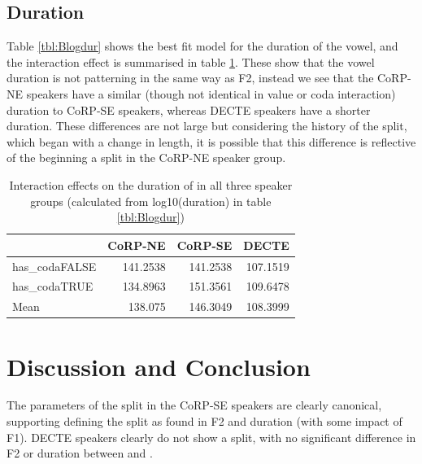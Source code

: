 \documentclass[../../00.FullDoc/tex/Thesis]{subfiles}
\begin{document}
\subsection{Duration}
Table \ref{tbl:Blogdur} shows the best fit model for the duration of the \bath{} vowel, and the interaction effect is summarised in table \ref{tbl:Blogdur-inter}. These show that the \bath{} vowel duration is not patterning in the same way as F2, instead we see that the CoRP-NE speakers have a similar (though not identical in value or coda interaction) duration to CoRP-SE speakers, whereas DECTE speakers have a shorter duration. These differences are not large but considering the history of the \TB{} split, which began with a change in length, it is possible that this difference is reflective of the beginning a split in the CoRP-NE speaker group.



\begin{table}[htbp]
	\centering
	\begin{tabular}{lrrr}
		\hline
		& \multicolumn{1}{l}{CoRP-NE} & \multicolumn{1}{l}{CoRP-SE} & \multicolumn{1}{l}{DECTE} \\
		\hline
		has\_codaFALSE & 141.2538 & 141.2538 & 107.1519 \\
		has\_codaTRUE & 134.8963 & 151.3561 & 109.6478 \\
		Mean  & 138.075 & 146.3049 & 108.3999 \\
		\hline
	\end{tabular}%
		\caption{Interaction effects on the duration of \bath{} in all three speaker groups (calculated from log10(duration) in table \ref{tbl:Blogdur})} \label{tbl:Blogdur-inter}%
\end{table}%


\begin{figure}[h]
	
	\caption{\bath{}} \label{fig:Bdurall}
\end{figure}

\section{Discussion and Conclusion}
The parameters of the \TB{} split in the CoRP-SE speakers are clearly canonical, supporting defining the \TB{} split as found in F2 and duration (with some impact of F1). DECTE speakers clearly do not show a \TB{} split, with no significant difference in F2 or duration between \trap{} and \bath{}.
\end{document}
